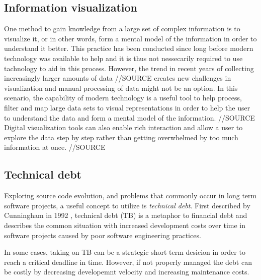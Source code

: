 \subsection{Information visualization}
One method to gain knowledge from a large set of complex information is to visualize it, or in other words, form a mental model of the information in order to understand it better. \cite{spence_information_2014}
This practice has been conducted since long before modern technology was available to help and it is thus not nessecarily required to use tachnology to aid in this process. \cite{friendly_brief_2008}
However, the trend in recent years of collecting increasingly larger amounts of data //SOURCE creates new challenges in visualization and manual processing of data might not be an option. 
In this scenario, the capability of modern technology is a useful tool to help process, filter and map large data sets to visual representations in order to help the user to understand the data and form a mental model of the information. //SOURCE
Digital visualization tools can also enable rich interaction and allow a user to explore the data step by step rather than getting overwhelmed by too much information at once. //SOURCE

\subsection{Technical debt}
Exploring source code evolution, and problems that commonly occur in long term software projects, a useful concept to utilize is \textit{technical debt}.
First described by Cunningham in 1992 \cite{cunningham_wycash_1992}, technical debt (TB) is a metaphor to financial debt and describes the common situation with increased development costs over time in software projects caused by poor software engineering practices. \cite{tom_exploration_2013}

In some cases, taking on TB can be a strategic short term desicion in order to reach a critical deadline in time.
However, if not properly managed the debt can be costly by decreasing developemnt velocity and increasing maintenance costs. \cite{seaman_using_2012}


